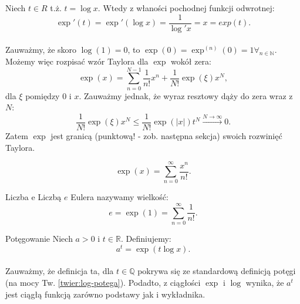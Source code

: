 \documentclass{article}
\newcounter{defi}
\numberwithin{defi}{section}
\numberwithin{defi}{section}
\newcommand{\R}{\mathbb{R}}
\newcommand{\N}{\mathbb{N}}
\newcommand{\Q}{\mathbb{Q}}
\newcommand{\oo}{\infty}
\renewcommand{\leq}{\leqslant}
\begin{document}
\begin{dow}{}
    Niech $t \in R$ t.ż. $t = \log x$. Wtedy z właności pochodnej funkcji odwrotnej: \begin{equation}
        \exp'(t) = \exp'(\log x) = \frac{1}{\log' x} = x = exp(t).
    \end{equation}
\end{dow}


\paragraph{} Zauważmy, że skoro $\log(1) = 0$, to $\exp(0) = \exp^{(n)}(0) = 1 \forall_{n\in \N}$. Możemy więc rozpisać wzór Taylora dla $\exp$ wokół zera: \begin{equation}
    \exp(x) = \sum_{n = 0}^{N - 1} \frac{1}{n!} x^n + \frac{1}{N!} \exp(\xi) x^N,
\end{equation} dla $\xi$ pomiędzy 0 i $x$. Zauważmy jednak, że wyraz resztowy dąży do zera wraz z $N$: \begin{equation}
    \frac{1}{N!} \exp(\xi) x^N \leq \frac{1}{N!} \exp(|x|) t^N \xrightarrow{N \to \oo} 0.
\end{equation} Zatem $\exp$ jest granicą (punktową! - zob. następna sekcja) swoich rozwinięć Taylora.

\begin{obs}{}
    \begin{equation}
        \exp(x) = \sum_{n = 0}^{\oo} \frac{x ^ n}{n!}.
    \end{equation}
\end{obs}

\begin{defr}{Liczba e}
    Liczbą $e$ Eulera nazywamy wielkość: \begin{equation}
        e = \exp (1) = \sum_{n = 0}^{\oo} \frac{1}{n!}.
    \end{equation}
\end{defr}

\begin{defr}{Potęgowanie}
    Niech $a > 0$ i $t \in \R$. Definiujemy: \begin{equation}
        a ^ t = \exp(t \log x).
    \end{equation}
\end{defr}
\paragraph{} Zauważmy, że definicja ta, dla $t \in \Q$ pokrywa się ze standardową definicją potęgi (na mocy Tw. \ref*{twier:log-potega}). Podadto, z ciągłości $\exp$ i $\log$ wynika, że $a^t$ jest ciągłą funkcją zarówno podstawy jak i wykładnika. 
\end{document}
